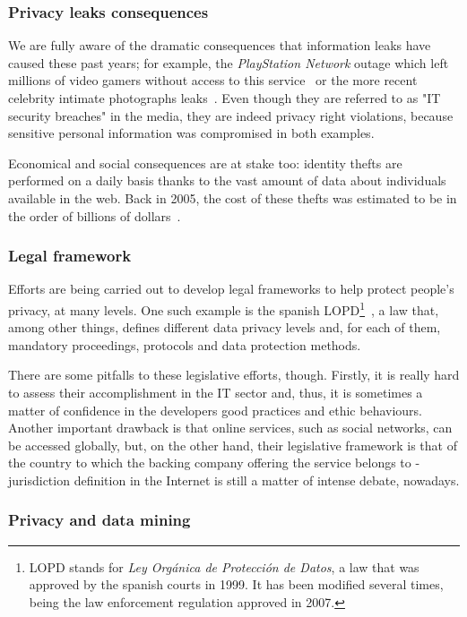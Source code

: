 \subsubsection{Privacy leaks consequences}

We are fully aware of the dramatic consequences that information leaks have caused these past years; for example, the \textit{PlayStation Network} outage which left millions of video gamers without access to this service~\cite{playstation1} or the more recent celebrity intimate photographs leaks~\cite{celebrities}. Even though they are referred to as "IT security breaches" in the media, they are indeed privacy right violations, because sensitive personal information was compromised in both examples.

Economical and social consequences are at stake too: identity thefts are performed on a daily basis thanks to the vast amount of data about individuals available in the web. Back in 2005, the cost of these thefts was estimated to be in the order of billions of dollars~\cite{DisclosureLaws}.

\subsubsection{Legal framework}

Efforts are being carried out to develop legal frameworks to help protect people’s privacy, at many levels. One such example is the spanish LOPD\footnote{LOPD stands for \textit{Ley Orgánica de Protección de Datos}, a law that was approved by the spanish courts in 1999. It has been modified several times, being the law enforcement regulation approved in 2007.}~\cite{lopd}, a law that, among other things, defines different data privacy levels and, for each of them, mandatory proceedings, protocols and data protection methods.

There are some pitfalls to these legislative efforts, though. Firstly, it is really hard to assess their accomplishment in the IT sector and, thus, it is sometimes a matter of confidence in the developers good practices and ethic behaviours. Another important drawback is that online services, such as social networks, can be accessed globally, but, on the other hand, their legislative framework is that of the country to which the backing company offering the service belongs to - jurisdiction definition in the Internet is still a matter of intense debate, nowadays.

\subsubsection{Privacy and data mining}


